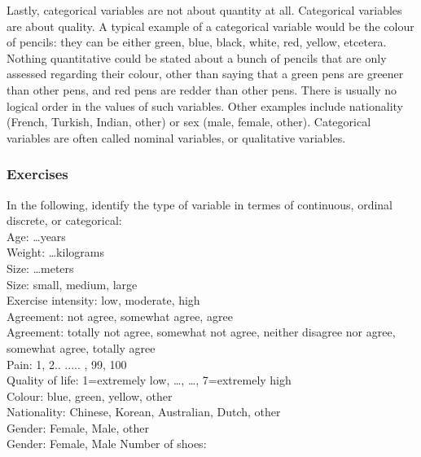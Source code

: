 Lastly, categorical variables are not about quantity at all. Categorical variables are about quality. A typical example of a categorical variable would be the colour of pencils: they can be either green, blue, black, white, red, yellow, etcetera. Nothing quantitative could be stated about a bunch of pencils that are only assessed regarding their colour, other than saying that a green pens are greener than other pens, and red pens are redder than other pens. There is usually no logical order in the values of such variables. Other examples include nationality (French, Turkish, Indian, other) or sex (male, female, other). Categorical variables are often called nominal variables, or qualitative variables.

\subsubsection{Exercises} 
In the following, identify the type of variable in termes of continuous, ordinal discrete, or categorical:\\
Age: \dots years\\
Weight: \dots kilograms\\
Size: \dots meters\\
Size: small, medium, large\\
Exercise intensity: low, moderate, high\\
Agreement: not agree, somewhat agree, agree\\
Agreement: totally not agree, somewhat not agree, neither disagree nor agree, somewhat agree, totally agree\\
Pain: 1, 2.. ..... , 99, 100\\
Quality of life: 1=extremely low, \dots, \dots, 7=extremely high\\
Colour: blue, green, yellow, other\\
Nationality: Chinese, Korean, Australian, Dutch, other\\
Gender: Female, Male, other \\
Gender: Female, Male
Number of shoes: \\




